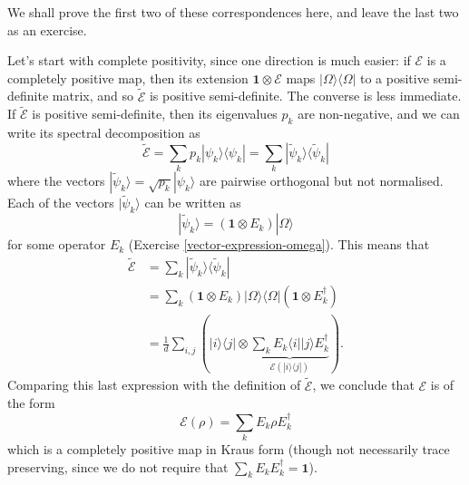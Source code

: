 \documentclass[fleqn]{article}
\begin{document}
We shall prove the first two of these correspondences here, and leave the last two as an exercise.

Let's start with complete positivity, since one direction is much easier: if \(\mathcal{E}\) is a completely positive map, then its extension \(\mathbf{1}\otimes\mathcal{E}\) maps \(|\Omega\rangle\langle\Omega|\) to a positive semi-definite matrix, and so \(\widetilde{\mathcal{E}}\) is positive semi-definite.
The converse is less immediate.
If \(\widetilde{\mathcal{E}}\) is positive semi-definite, then its eigenvalues \(p_k\) are non-negative, and we can write its spectral decomposition as
\[
  \widetilde{\mathcal{E}}
  = \sum_k p_k|\psi_k\rangle\langle\psi_k|
  = \sum_k |\widetilde{\psi}_k\rangle\langle\widetilde{\psi}_k|
\]
where the vectors \(|\widetilde{\psi}_k\rangle=\sqrt{p_k}|\psi_k\rangle\) are pairwise orthogonal but not normalised.
Each of the vectors \(|\widetilde{\psi}_k\rangle\) can be written as
\[
  |\widetilde{\psi}_k\rangle
  = (\mathbf{1}\otimes E_k)|\Omega\rangle
\]
for some operator \(E_k\) (Exercise \ref{vector-expression-omega}).
This means that
\[
  \begin{aligned}
    \widetilde{\mathcal{E}}
    &= \sum_k |\widetilde{\psi}_k\rangle\langle\widetilde{\psi}_k|
  \\&= \sum_k (\mathbf{1}\otimes E_k)|\Omega\rangle\langle\Omega|(\mathbf{1}\otimes E_k^\dagger)
  \\&= \frac{1}{d}\sum_{i,j} \left(|i\rangle\langle j|\otimes\underbrace{\sum_k E_k\langle i||j\rangle E_k^\dagger}_{\mathcal{E}(|i\rangle\langle j|)}\right).
  \end{aligned}
\]
Comparing this last expression with the definition of \(\widetilde{\mathcal{E}}\), we conclude that \(\mathcal{E}\) is of the form
\[
  \mathcal{E}(\rho)
  = \sum_k E_k\rho E_k^\dagger
\]
which is a completely positive map in Kraus form (though not necessarily trace preserving, since we do not require that \(\sum_k E_k E_k^\dagger=\mathbf{1}\)).
\end{document}
